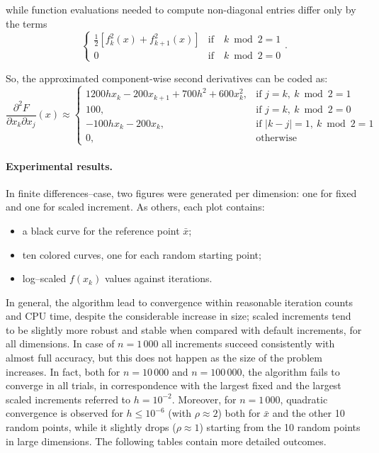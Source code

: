 \documentclass[a4paper,12pt]{article}
\begin{document}
	while function evaluations needed to compute non-diagonal entries differ only by the terms 
	\[
	\begin{cases}
		\frac{1}{2}[f^{2}_{k}(x) + f^{2}_{k+1}(x)]& \text{if} \quad k \bmod 2 = 1 \\
		
		0 & \text{if} \quad k \bmod 2 = 0
		
	\end{cases}.	
	\]
	
	So, the approximated component-wise second derivatives can be coded as:
	\[
	\frac{\partial^2 F}{\partial x_k \partial x_j}(x) \approx
	\begin{cases}
		1200hx_k - 200x_{k+1} + 700h^2 + 600x_k^2, & \text{if } j = k,\ k \bmod 2 = 1 \\
		100, & \text{if } j = k,\ k \bmod 2 = 0 \\
		-100hx_k - 200x_k, & \text{if } |k - j| = 1,\ k \bmod 2 = 1 \\
		0, & \text{otherwise}
	\end{cases}
	\]
	
	\paragraph{Experimental results.}
	
	In finite differences--case, two figures were generated per dimension: one for fixed and one for scaled increment. As others, each plot contains:
	\begin{itemize}
		\item a black curve for the reference point \( \bar{x} \);
		\item ten colored curves, one for each random starting point;
		\item log--scaled \( f(x_k) \) values against iterations.
	\end{itemize}
	\vspace{0.5cm}
	In general, the algorithm lead to convergence within reasonable iteration counts and CPU time, despite the considerable increase in size; scaled increments tend to be slightly more robust and stable when compared with default increments, for all dimensions. In case of $n = 1\,000$ all increments succeed consistently with almost full accuracy, but this does not happen as the size of the problem increases. In fact, both for $n = 10\,000$ and $n = 100\,000$, the algorithm fails to converge in all trials, in correspondence with the largest fixed and the largest scaled increments referred to \( h = 10^{-2} \). Moreover, for $n = 1\,000$, quadratic convergence is observed for \( h \leq 10^{-6} \) (with \(\rho \approx 2\)) both for $\bar{x}$ and the other 10 random points, while it slightly drops (\(\rho \approx 1\)) starting from the 10 random points in large dimensions. The following tables contain more detailed outcomes.\\
	
\end{document}
